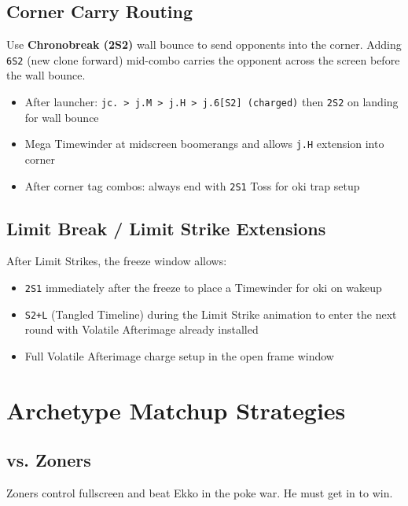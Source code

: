 \documentclass[12pt, a4paper]{report}
\newcommand{\notation}[1]{{\small\texttt{\textcolor{ekkoBlue}{#1}}}}
\newcommand{\movename}[1]{\textbf{\textcolor{ekkoGold}{#1}}}
\begin{document}
\section{Corner Carry Routing}

\begin{tipbox}
Use \movename{Chronobreak (2S2)} wall bounce to send opponents into the corner. Adding \notation{6S2} (new clone forward) mid-combo carries the opponent across the screen before the wall bounce.
\end{tipbox}

\begin{itemize}
  \item After launcher: \notation{jc. > j.M > j.H > j.6[S2] (charged)} then \notation{2S2} on landing for wall bounce
  \item Mega Timewinder at midscreen boomerangs and allows \notation{j.H} extension into corner
  \item After corner tag combos: always end with \notation{2S1} Toss for oki trap setup
\end{itemize}

\section{Limit Break / Limit Strike Extensions}

After Limit Strikes, the freeze window allows:
\begin{itemize}
  \item \notation{2S1} immediately after the freeze to place a Timewinder for oki on wakeup
  \item \notation{S2+L} (Tangled Timeline) during the Limit Strike animation to enter the next round with Volatile Afterimage already installed
  \item Full Volatile Afterimage charge setup in the open frame window
\end{itemize}

\chapter{Archetype Matchup Strategies}

\section{vs. Zoners}

Zoners control fullscreen and beat Ekko in the poke war. He must get in to win.
\end{document}
